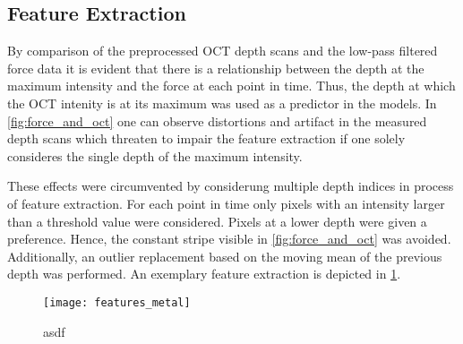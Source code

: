 \subsection{Feature Extraction}\label{subsec:feature_extraction}

By comparison of the preprocessed OCT depth scans and the low-pass filtered force data it is evident that there is a relationship between the depth at the maximum intensity and the force at each point in time.
Thus, the depth at which the OCT intenity is at its maximum was used as a predictor in the models.
In \cref{fig:force_and_oct} one can observe distortions and artifact in the measured depth scans which threaten to impair the feature extraction if one solely consideres the single depth of the maximum intensity.

These effects were circumvented by considerung multiple depth indices in process of feature extraction.
For each point in time only pixels with an intensity larger than a threshold value were considered.
Pixels at a lower depth were given a preference.
Hence, the constant stripe visible in \cref{fig:force_and_oct} was avoided.
Additionally, an outlier replacement based on the moving mean of the previous depth was performed.
An exemplary feature extraction is depicted in \cref{fig:features_metal}.

\begin{figure}
    \centering
    \texttt{[image: features\_metal]}
    \caption{asdf}
    \label{fig:features_metal}
\end{figure}
